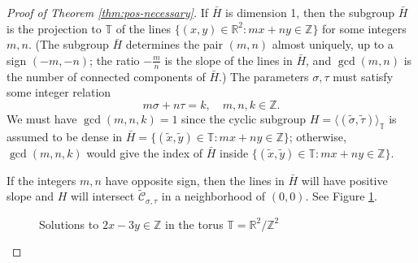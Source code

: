 \documentclass[11pt, letterpaper, reqno]{amsart}
\theoremstyle{definition}
\numberwithin{equation}{section}
\newcommand{\RR}{\ensuremath{\mathbb{R}}}
\newcommand{\ZZ}{\ensuremath{\mathbb{Z}}}
\newcommand{\TT}{\mathbb{T}}
\newcommand{\cCbar}{\widetilde{\mathcal{C}}}
\newcommand{\talpha}{{\sigma}}
\newcommand{\trho}{{\tau}}
\begin{document}
{\begin{proof}[Proof of Theorem \ref{thm:pos-necessary}]
If $\bar{H}$ is dimension 1, then 
the subgroup $\bar{H}$ is the projection to $\TT$ of the lines 
$\{ (x,y)\in \RR^2 : mx + ny \in \ZZ \}$
for some integers $m,n$.
(The subgroup $\bar{H}$ determines the pair $(m,n)$ almost uniquely, up to a sign $(-m,-n)$;
the ratio $-\frac{m}{n}$ is the slope of the lines in $\bar{H}$, 
and $\gcd(m,n)$ is the number of connected components of $\bar{H}$.)
The parameters $\talpha,\trho$ must satisfy some integer relation
\begin{equation*}
m\talpha + n\trho = k, \quad m,n,k \in \ZZ .
\end{equation*}
We must have $\gcd(m,n,k) = 1$
since the cyclic subgroup $H = \langle (\widetilde{\talpha},\widetilde{\trho}) \rangle_{\TT}$ 
is assumed to be dense in $\bar{H} = \{(\widetilde{x},\widetilde{y})\in \TT : mx + ny \in \ZZ\}$; 
otherwise, $\gcd(m,n,k)$ would give the index of $\bar{H}$ inside 
$\{(\widetilde{x},\widetilde{y})\in \TT : mx + ny \in \ZZ\}$.

If the integers $m,n$ have opposite sign, 
then the lines in $\bar{H}$ will have positive slope and $H$ will intersect 
$\cCbar_{\talpha,\trho}$ in a neighborhood of $(0,0)$. 
See Figure \ref{fig:torus-pos-slope}.
\begin{figure}[h]
\begin{center}
\end{center}
\caption{Solutions to $2x-3y\in\ZZ$ in the torus $\TT = \RR^2/\ZZ^2$}
\label{fig:torus-pos-slope}
\end{figure} 


\end{proof}}
\end{document}

